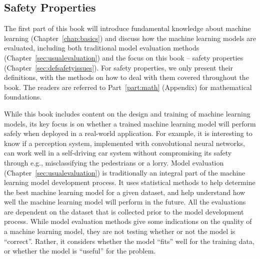 % 
%
%

\begin{partbacktext}
\part{Safety Properties}\label{chap:intro}

The first part of this book will introduce fundamental knowledge about machine learning (Chapter~\ref{chap:basics}) and discuss how the machine learning models are evaluated, including both traditional model evaluation methods (Chapter~\ref{sec:usualevaluation}) and the focus on this book -- safety properties (Chapter~\ref{sec:defsafetyissues}). For safety properties, we only present their definitions, with the methods on how to deal with them covered throughout the book. 
The readers are referred to Part~\ref{part:math} (Appendix) for mathematical foundations.


While this book includes content on the design and training of machine learning models, its key focus is on whether a trained machine learning model will perform safely 
when deployed in a real-world application. For example, it is interesting to know if a perception system, implemented with convolutional neural networks, can work well in a self-driving car system without compromising its safety through e.g., misclassifying the pedestrians or a lorry.
Model evaluation (Chapter~\ref{sec:usualevaluation}) is traditionally an integral part of the machine learning model development process. It uses statistical methods to help determine the best machine learning model for a given dataset, and help understand how well the machine learning model will perform in the future. All the evaluations are dependent on the dataset that is collected prior to the model development process. While  model evaluation methods give some indications on the quality of a machine learning model, they are not testing whether or not the model is ``correct''. Rather, it considers whether the model ``fits'' well for the training data, or whether the model is ``useful'' for the problem. 


\end{partbacktext}
